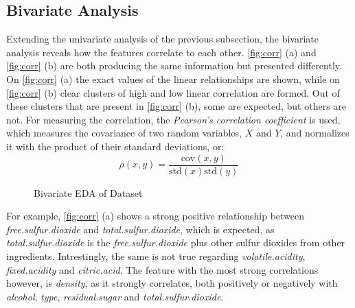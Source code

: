 \documentclass[11pt,twoside]{article}
\numberwithin{Theorem}{section}
\numberwithin{Definition}{section}
\numberwithin{Lemma}{section}
\numberwithin{Algorithm}{section}
\numberwithin{equation}{section}
\begin{document}
\subsection{Bivariate Analysis}
\label{sec:bivariate}
Extending the univariate analysis of the previous subsection, the bivariate analysis reveals how the features correlate to each other. \autoref{fig:corr} (a) and \autoref{fig:corr} (b) are both producing the same information but presented differently. On \autoref{fig:corr} (a) the exact values of the linear relationships are shown, while on \autoref{fig:corr} (b) clear clusters of high and low linear correlation are formed. Out of these clusters that are present in \autoref{fig:corr} (b), some are expected, but others are not.
For measuring the correlation, the \textit{Pearson's correlation coefficient} is used, which measures the covariance of two random variables, $X$ and $Y$, and normalizes it with the product of their standard deviations, or:
\begin{equation}
\rho(x,y) = \frac{\text{cov}(x,y)}{\text{std}(x)\text{std}(y)}
\end{equation}
\begin{figure}[h]
    \centering
    \caption{Bivariate EDA of Dataset}
    \label{fig:corr}
\end{figure}
For example, \autoref{fig:corr} (a) shows a strong positive relationship between \textit{free.sulfur.dioxide} and \textit{total.sulfur.dioxide}, which is expected, as \textit{total.sulfur.dioxide} is the \textit{free.sulfur.dioxide} plus other sulfur dioxides from other ingredients. Intrestingly, the same is not true regarding \textit{volatile.acidity}, \textit{fixed.acidity} and \textit{citric.acid}. The feature with the most strong correlations however, is \textit{density}, as it strongly correlates, both positively or negatively with \textit{alcohol}, \textit{type}, \textit{residual.sugar} and \textit{total.sulfur.dioxide}.
\end{document}
